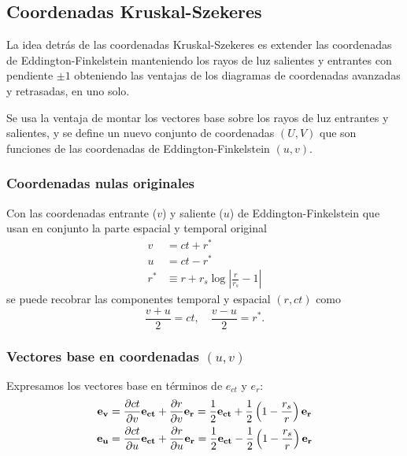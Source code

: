 \subsection{Coordenadas Kruskal-Szekeres}
La idea detrás de las coordenadas Kruskal-Szekeres es extender las coordenadas de Eddington-Finkelstein manteniendo los rayos de luz salientes y entrantes con pendiente $\pm 1$ obteniendo las ventajas de los diagramas de coordenadas avanzadas y retrasadas, en uno solo.

Se usa la ventaja de montar los vectores base sobre los rayos de luz entrantes y salientes, y se define un nuevo conjunto de coordenadas \( (U, V) \) que son funciones de las coordenadas de Eddington-Finkelstein \( (u, v) \).
\subsubsection{Coordenadas nulas originales}
Con las coordenadas entrante (\(v\)) y saliente (\(u\)) de Eddington-Finkelstein que usan en conjunto la parte espacial y temporal original
\begin{equation}
    \begin{aligned}
        v   & = ct + r^*                                      \\
        u   & = ct - r^*                                      \\
        r^* & \equiv r + r_s \log\left|\frac{r}{r_s}-1\right|
    \end{aligned}
\end{equation}
se puede recobrar las componentes temporal y espacial \( (r, ct) \) como
\begin{equation}
    \frac{v+ u}{2} = ct, \quad \frac{v- u}{2} = r^*.
    \label{eq:ryt_in_terms_of_uv}
\end{equation}


\subsubsection{Vectores base en coordenadas \( (u, v) \)}
Expresamos los vectores base en términos de \( e_{ct} \) y \( e_r \):
\begin{equation}
    \begin{aligned}
        \mathbf{e_v} & = \frac{\partial ct}{\partial v}\mathbf{e_{ct}} + \frac{\partial r}{\partial v}\mathbf{e_r} = \frac{1}{2}\mathbf{e_{ct}} + \frac{1}{2}\left(1-\frac{r_s}{r}\right)\mathbf{e_r} \\
        \mathbf{e_u} & = \frac{\partial ct}{\partial u}\mathbf{e_{ct}} + \frac{\partial r}{\partial u}\mathbf{e_r} = \frac{1}{2}\mathbf{e_{ct}} - \frac{1}{2}\left(1-\frac{r_s}{r}\right)\mathbf{e_r}
    \end{aligned}
\end{equation}



